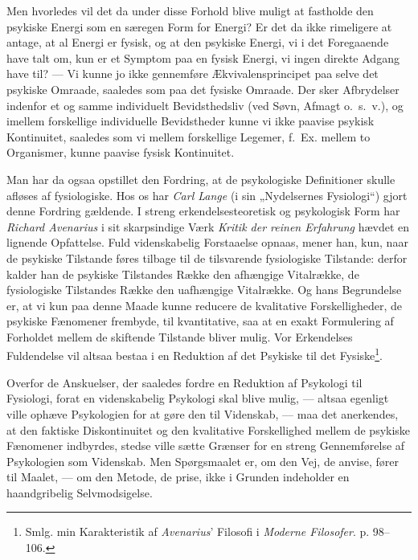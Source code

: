\documentclass[12pt,a4paper]{book}
\newcommand{\apage}[1]{\marginnote{\footnotesize\textit{[#1]}}}
\begin{document}
\apage{24} Men hvorledes vil det da under disse Forhold blive muligt at fastholde
den psykiske Energi som en særegen Form for Energi? Er det da ikke
rimeligere at antage, at al Energi er fysisk, og at den psykiske
Energi, vi i det Foregaaende have talt om, kun er et Symptom paa en
fysisk Energi, vi ingen direkte Adgang have til? --- Vi kunne jo ikke
gennemføre Ækvivalensprincipet paa selve det psykiske Omraade,
saaledes som paa det fysiske Omraade. Der sker Afbrydelser indenfor et
og samme individuelt Bevidsthedsliv (ved Søvn, Afmagt o.\ s.\ v.), og
imellem forskellige individuelle Bevidstheder kunne vi ikke paavise
psykisk Kontinuitet, saaledes som vi mellem forskellige Legemer,
f.\ Ex. mellem to Organismer, kunne paavise fysisk Kontinuitet.

Man har da ogsaa opstillet den Fordring, at de psykologiske
Definitioner skulle afløses af fysiologiske. Hos os har \emph{Carl
Lange} (i sin „Nydelsernes Fysiologi“) gjort denne Fordring gældende.
I streng erkendelsesteoretisk og psykologisk Form har \emph{Richard
Avenarius} i sit skarpsindige Værk \emph{Kritik der reinen Erfahrung}
hævdet en lignende Opfattelse. Fuld videnskabelig Forstaaelse opnaas,
mener han, kun, naar de psykiske Tilstande føres tilbage til de
tilsvarende fysiologiske Tilstande: derfor kalder han de psykiske
Tilstandes Række den afhængige Vitalrække, de fysiologiske Tilstandes
Række den uafhængige Vitalrække. Og hans Begrundelse er, at vi kun paa
denne Maade kunne reducere de kvalitative Forskelligheder, de psykiske
Fænomener frembyde, til kvantitative, saa at en exakt Formulering af
Forholdet mellem de skiftende Tilstande bliver mulig. Vor Erkendelses
Fuldendelse vil altsaa bestaa i en Reduktion af det Psykiske til det
Fysiske\footnote{Smlg. min Karakteristik af \emph{Avenarius}’ Filosofi
i \emph{Moderne Filosofer}. p. 98--106.}.

Overfor de Anskuelser, der saaledes fordre en Reduktion af Psykologi
til Fysiologi, forat en videnskabelig Psykologi skal blive mulig, ---
altsaa egenligt ville ophæve Psykologien for at gøre den til
Videnskab, --- maa det anerkendes, at den faktiske Diskontinuitet og
den kvalitative Forskellighed \apage{25} mellem de psykiske Fænomener indbyrdes,
stedse ville sætte Grænser for en streng Gennemførelse af Psykologien
som Videnskab. Men Spørgsmaalet er, om den Vej, de anvise, fører til
Maalet, --- om den Metode, de prise, ikke i Grunden indeholder en
haandgribelig Selvmodsigelse.
\end{document}
